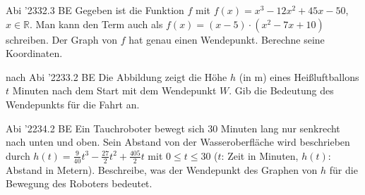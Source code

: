 \documentclass[11pt]{article}
\begin{document}
\begin{pfaufg}{Abi ’23}{32.}{3 BE}
Gegeben ist die Funktion $f$ mit $f(x) = x^3 - 12x^2 + 45x - 50$, $x \in \mathbb{R}$. Man kann den Term auch als $f(x) = (x - 5)\cdot(x^2 - 7x + 10)$ schreiben. Der Graph von $f$ hat genau einen Wendepunkt. Berechne seine Koordinaten.
\end{pfaufg}
\pfgruppe{}
\begin{pfaufg}{nach Abi ’22}{33.}{2 BE}
Die Abbildung zeigt die Höhe $h$ (in m) eines Heißluftballons $t$ Minuten nach dem Start mit dem Wendepunkt $W$. Gib die Bedeutung des Wendepunkts für die Fahrt an.
\par\smallskip\noindent \begin{ksys}[xmin=0,xmax=20,ymin=0,ymax=90,xstep=5,ystep=10,xlabel=t in min,ylabel=h in m,ablesen]   \end{ksys}\par
{}
\end{pfaufg}
\begin{pfaufg}{Abi ’22}{34.}{2 BE}
Ein Tauchroboter bewegt sich 30 Minuten lang nur senkrecht nach unten und oben. Sein Abstand von der Wasseroberfläche wird beschrieben durch $h(t) = \tfrac{9}{40}t^3 - \tfrac{27}{2}t^2 + \tfrac{405}{2}t$ mit $0 \le t \le 30$ ($t$: Zeit in Minuten, $h(t)$: Abstand in Metern). Beschreibe, was der Wendepunkt des Graphen von $h$ für die Bewegung des Roboters bedeutet.
\par\smallskip\noindent {}\par
{}
\end{pfaufg}
\pfgruppe{}
\end{document}
